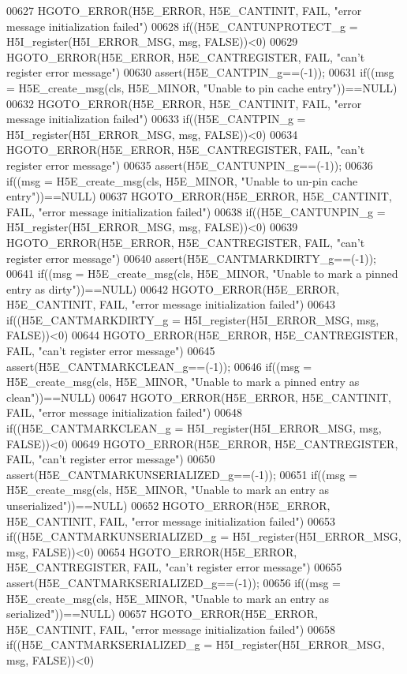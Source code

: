 \begin{DoxyCode}
00627     HGOTO\_ERROR(H5E\_ERROR, H5E\_CANTINIT, FAIL, "error message initialization failed")
00628 if((H5E\_CANTUNPROTECT\_g = H5I\_register(H5I\_ERROR\_MSG, msg, FALSE))<0)
00629     HGOTO\_ERROR(H5E\_ERROR, H5E\_CANTREGISTER, FAIL, "can't register error message")
00630 assert(H5E\_CANTPIN\_g==(-1));
00631 if((msg = H5E\_create\_msg(cls, H5E\_MINOR, "Unable to pin cache entry"))==NULL)
00632     HGOTO\_ERROR(H5E\_ERROR, H5E\_CANTINIT, FAIL, "error message initialization failed")
00633 if((H5E\_CANTPIN\_g = H5I\_register(H5I\_ERROR\_MSG, msg, FALSE))<0)
00634     HGOTO\_ERROR(H5E\_ERROR, H5E\_CANTREGISTER, FAIL, "can't register error message")
00635 assert(H5E\_CANTUNPIN\_g==(-1));
00636 if((msg = H5E\_create\_msg(cls, H5E\_MINOR, "Unable to un-pin cache entry"))==NULL)
00637     HGOTO\_ERROR(H5E\_ERROR, H5E\_CANTINIT, FAIL, "error message initialization failed")
00638 if((H5E\_CANTUNPIN\_g = H5I\_register(H5I\_ERROR\_MSG, msg, FALSE))<0)
00639     HGOTO\_ERROR(H5E\_ERROR, H5E\_CANTREGISTER, FAIL, "can't register error message")
00640 assert(H5E\_CANTMARKDIRTY\_g==(-1));
00641 if((msg = H5E\_create\_msg(cls, H5E\_MINOR, "Unable to mark a pinned entry as dirty"))==NULL)
00642     HGOTO\_ERROR(H5E\_ERROR, H5E\_CANTINIT, FAIL, "error message initialization failed")
00643 if((H5E\_CANTMARKDIRTY\_g = H5I\_register(H5I\_ERROR\_MSG, msg, FALSE))<0)
00644     HGOTO\_ERROR(H5E\_ERROR, H5E\_CANTREGISTER, FAIL, "can't register error message")
00645 assert(H5E\_CANTMARKCLEAN\_g==(-1));
00646 if((msg = H5E\_create\_msg(cls, H5E\_MINOR, "Unable to mark a pinned entry as clean"))==NULL)
00647     HGOTO\_ERROR(H5E\_ERROR, H5E\_CANTINIT, FAIL, "error message initialization failed")
00648 if((H5E\_CANTMARKCLEAN\_g = H5I\_register(H5I\_ERROR\_MSG, msg, FALSE))<0)
00649     HGOTO\_ERROR(H5E\_ERROR, H5E\_CANTREGISTER, FAIL, "can't register error message")
00650 assert(H5E\_CANTMARKUNSERIALIZED\_g==(-1));
00651 if((msg = H5E\_create\_msg(cls, H5E\_MINOR, "Unable to mark an entry as unserialized"))==NULL)
00652     HGOTO\_ERROR(H5E\_ERROR, H5E\_CANTINIT, FAIL, "error message initialization failed")
00653 if((H5E\_CANTMARKUNSERIALIZED\_g = H5I\_register(H5I\_ERROR\_MSG, msg, FALSE))<0)
00654     HGOTO\_ERROR(H5E\_ERROR, H5E\_CANTREGISTER, FAIL, "can't register error message")
00655 assert(H5E\_CANTMARKSERIALIZED\_g==(-1));
00656 if((msg = H5E\_create\_msg(cls, H5E\_MINOR, "Unable to mark an entry as serialized"))==NULL)
00657     HGOTO\_ERROR(H5E\_ERROR, H5E\_CANTINIT, FAIL, "error message initialization failed")
00658 if((H5E\_CANTMARKSERIALIZED\_g = H5I\_register(H5I\_ERROR\_MSG, msg, FALSE))<0)

\end{DoxyCode}
